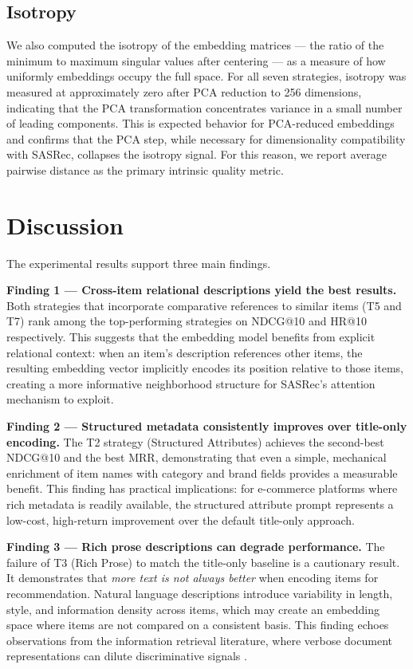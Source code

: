 \documentclass[12pt,a4paper]{report}
\begin{document}
\subsection*{Isotropy}

We also computed the isotropy of the embedding matrices — the ratio of the
minimum to maximum singular values after centering — as a measure of how
uniformly embeddings occupy the full space. For all seven strategies, isotropy
was measured at approximately zero after PCA reduction to 256 dimensions,
indicating that the PCA transformation concentrates variance in a small number
of leading components. This is expected behavior for PCA-reduced embeddings and
confirms that the PCA step, while necessary for dimensionality compatibility
with SASRec, collapses the isotropy signal. For this reason, we report average
pairwise distance as the primary intrinsic quality metric.

\section{Discussion}
\label{sec:pc_discussion}

The experimental results support three main findings.

\textbf{Finding 1 — Cross-item relational descriptions yield the best results.}
Both strategies that incorporate comparative references to similar items
(T5 and T7) rank among the top-performing strategies on NDCG@10 and
HR@10 respectively. This suggests that the embedding model benefits from
explicit relational context: when an item's description references other
items, the resulting embedding vector implicitly encodes its position
relative to those items, creating a more informative neighborhood
structure for SASRec's attention mechanism to exploit.

\textbf{Finding 2 — Structured metadata consistently improves over
title-only encoding.} The T2 strategy (Structured Attributes) achieves
the second-best NDCG@10 and the best MRR, demonstrating that even a
simple, mechanical enrichment of item names with category and brand
fields provides a measurable benefit. This finding has practical
implications: for e-commerce platforms where rich metadata is readily
available, the structured attribute prompt represents a low-cost,
high-return improvement over the default title-only approach.

\textbf{Finding 3 — Rich prose descriptions can degrade performance.}
The failure of T3 (Rich Prose) to match the title-only baseline is
a cautionary result. It demonstrates that \emph{more text is not
always better} when encoding items for recommendation. Natural language
descriptions introduce variability in length, style, and information
density across items, which may create an embedding space where items
are not compared on a consistent basis. This finding echoes observations
from the information retrieval literature, where verbose document
representations can dilute discriminative signals
\citep{robertson2009smooth}.
\end{document}

